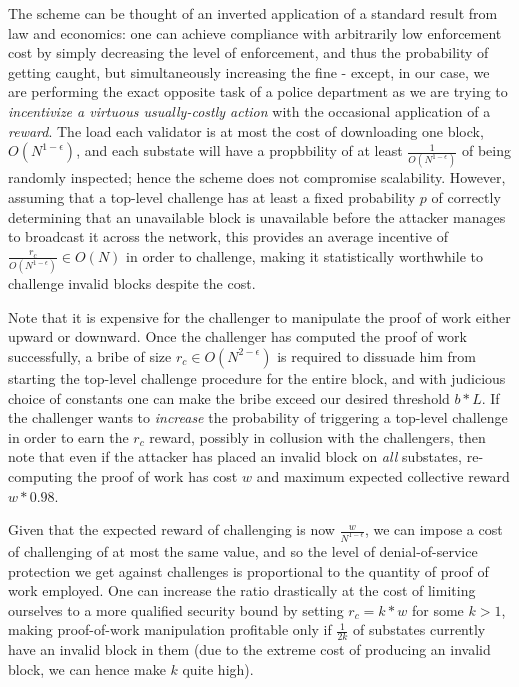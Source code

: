 \documentclass[11pt,a4paper]{report}
\theoremstyle{plain}
\theoremstyle{definition}
\theoremstyle{remark}
\begin{document}
The scheme can be thought of an inverted application of a standard result from law and economics: one can achieve compliance with arbitrarily low enforcement cost by simply decreasing the level of enforcement, and thus the probability of getting caught, but simultaneously increasing the fine \citep{eide_economics_2006} - except, in our case, we are performing the exact opposite task of a police department as we are trying to \emph{incentivize a virtuous usually-costly action} with the occasional application of a \emph{reward}. The load each validator is at most the cost of downloading one block, $O(N^{1-\epsilon})$, and each substate will have a propbbility of at least $\frac{1}{O(N^{1-\epsilon})}$ of being randomly inspected; hence the scheme does not compromise scalability. However, assuming that a top-level challenge has at least a fixed probability $p$ of correctly determining that an unavailable block is unavailable before the attacker manages to broadcast it across the network, this provides an average incentive of $\frac{r_c}{O(N^{1-\epsilon})} \in O(N)$ in order to challenge, making it statistically worthwhile to challenge invalid blocks despite the cost.

Note that it is expensive for the challenger to manipulate the proof of work either upward or downward. Once the challenger has computed the proof of work successfully, a bribe of size $r_c \in O(N^{2-\epsilon})$ is required to dissuade him from starting the top-level challenge procedure for the entire block, and with judicious choice of constants one can make the bribe exceed our desired threshold $b * L$. If the challenger wants to \emph{increase} the probability of triggering a top-level challenge in order to earn the $r_c$ reward, possibly in collusion with the challengers, then note that even if the attacker has placed an invalid block on \emph{all} substates, re-computing the proof of work has cost $w$ and maximum expected collective reward $w * 0.98$.

Given that the expected reward of challenging is now $\frac{w}{N^{1-\epsilon}}$, we can impose a cost of challenging of at most the same value, and so the level of denial-of-service protection we get against challenges is proportional to the quantity of proof of work employed. One can increase the ratio drastically at the cost of limiting ourselves to a more qualified security bound by setting $r_c = k * w$ for some $k > 1$, making proof-of-work manipulation profitable only if $\frac{1}{2k}$ of substates currently have an invalid block in them (due to the extreme cost of producing an invalid block, we can hence make $k$ quite high).
\end{document}
